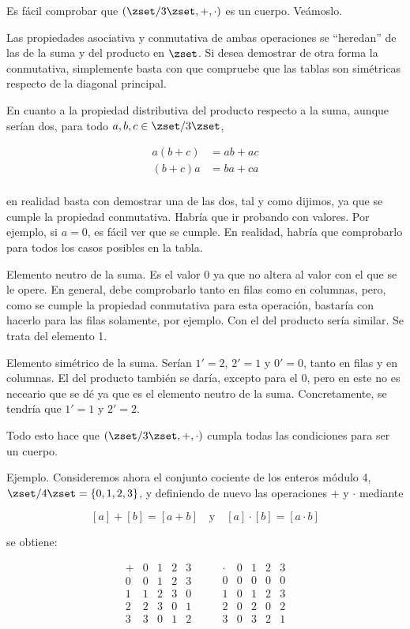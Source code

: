 Es fácil comprobar que $(\zset/3\zset, +, \cdot)$ es un cuerpo. Veámoslo.

Las propiedades asociativa y conmutativa de ambas operaciones se ``heredan''
de las de la suma y del producto en $\zset$. Si desea demostrar de otra
forma la conmutativa, simplemente basta con que compruebe que las tablas son
simétricas respecto de la diagonal principal.

En cuanto a la propiedad distributiva del producto respecto a la suma,
aunque serían dos, para todo $a, b, c \in \zset/3\zset$,

\begin{align*}
  a(b + c) &= ab + ac \\
  (b + c)a &= ba + ca \\
\end{align*}

\noindent en realidad basta con demostrar una de las dos, tal y como
dijimos, ya que se cumple la propiedad conmutativa. Habría que ir probando
con valores. Por ejemplo, si $a = 0$, es fácil ver que se cumple. En
realidad, habría que comprobarlo para todos los casos posibles en la tabla.

Elemento neutro de la suma. Es el valor 0 ya que no altera al valor con el
que se le opere. En general, debe comprobarlo tanto en filas como en
columnas, pero, como se cumple la propiedad conmutativa para esta operación,
bastaría con hacerlo para las filas solamente, por ejemplo. Con el del
producto sería similar. Se trata del elemento 1.

Elemento simétrico de la suma. Serían $1' = 2$, $2' = 1$ y $0' = 0$, tanto
en filas y en columnas. El del producto también se daría, excepto para el 0,
pero en este no es neceario que se dé ya que es el elemento neutro de la
suma. Concretamente, se tendría que $1' = 1$ y $2' = 2$.

Todo esto hace que $(\zset/3\zset, +, \cdot)$ cumpla todas las condiciones
para ser un cuerpo.

Ejemplo. Consideremos ahora el conjunto cociente de los enteros módulo 4,
$\zset/4\zset = \{0,1,2,3\}$,  y definiendo de nuevo las operaciones $+$ y
$\cdot$ mediante

$$ [a] + [b] = [a + b] \quad \text{y} \quad [a] \cdot [b] = [a \cdot b] $$

\noindent se obtiene:

$$
  \begin{array}{c|cccc}
  + & 0 & 1 & 2 & 3 \\
  \hline
  0 & 0 & 1 & 2 & 3 \\
  1 & 1 & 2 & 3 & 0 \\
  2 & 2 & 3 & 0 & 1 \\
  3 & 3 & 0 & 1 & 2
  \end{array}
  \qquad
  \begin{array}{c|cccc}
  \cdot & 0 & 1 & 2 & 3 \\
  \hline
  0 & 0 & 0 & 0 & 0 \\
  1 & 0 & 1 & 2 & 3 \\
  2 & 0 & 2 & 0 & 2 \\
  3 & 0 & 3 & 2 & 1
  \end{array}
$$

